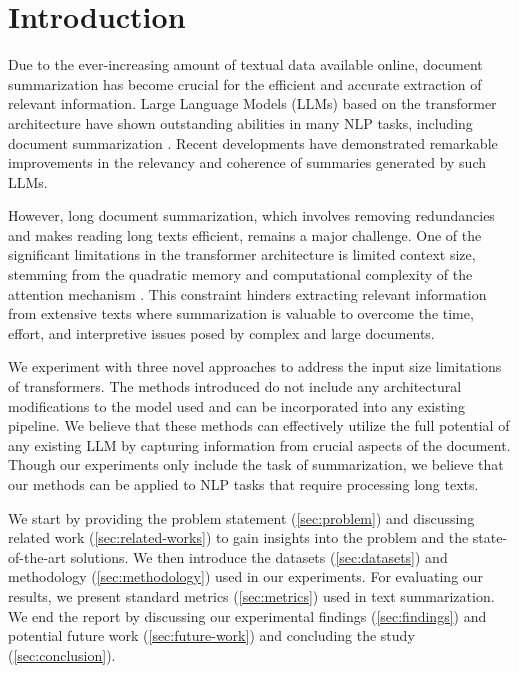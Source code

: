 \section{Introduction}
\label{sec:introduction}

Due to the ever-increasing amount of textual data available online, document summarization has become crucial for the efficient and accurate extraction of relevant information.
Large Language Models (LLMs) based on the transformer architecture \cite{vaswani2017attention} have shown outstanding abilities in many NLP tasks, including document summarization \cite{yadav2023state}.
Recent developments have demonstrated remarkable improvements in the relevancy and coherence of summaries generated by such LLMs.

However, long document summarization, which involves removing redundancies and makes reading long texts efficient, remains a major challenge.
One of the significant limitations in the transformer architecture is limited context size, stemming from the quadratic memory and computational complexity of the attention mechanism \cite{du2023improving}.
This constraint hinders extracting relevant information from extensive texts where summarization is valuable to overcome the time, effort, and interpretive issues posed by complex and large documents.

We experiment with three novel approaches to address the input size limitations of transformers.
The methods introduced do not include any architectural modifications to the model used and can be incorporated into any existing pipeline.
We believe that these methods can effectively utilize the full potential of any existing LLM by capturing information from crucial aspects of the document.
Though our experiments only include the task of summarization, we believe that our methods can be applied to NLP tasks that require processing long texts.

We start by providing the problem statement (\autoref{sec:problem}) and discussing related work (\autoref{sec:related-works}) to gain insights into the problem and the state-of-the-art solutions.
We then introduce the datasets (\autoref{sec:datasets}) and methodology (\autoref{sec:methodology}) used in our experiments.
For evaluating our results, we present standard metrics (\autoref{sec:metrics}) used in text summarization.
We end the report by discussing our experimental findings (\autoref{sec:findings}) and potential future work (\autoref{sec:future-work}) and concluding the study (\autoref{sec:conclusion}).
